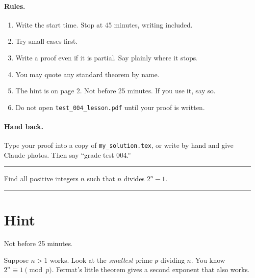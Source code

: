 \documentclass[11pt]{article}
\begin{document}

\paragraph{Rules.}
\begin{enumerate}
  \item Write the start time. Stop at 45 minutes, writing included.
  \item Try small cases first.
  \item Write a proof even if it is partial. Say plainly where it stops.
  \item You may quote any standard theorem by name.
  \item The hint is on page 2. Not before 25 minutes. If you use it, say so.
  \item Do not open \texttt{test\_004\_lesson.pdf} until your proof is written.
\end{enumerate}

\paragraph{Hand back.} Type your proof into a copy of \texttt{my\_solution.tex}, or write by hand and give Claude photos. Then say ``grade test 004.''

\vspace{10pt}\hrule\vspace{10pt}

\begin{problem}
Find all positive integers $n$ such that $n$ divides $2^n - 1$.
\end{problem}

\vspace{10pt}\hrule

\clearpage
\section*{Hint}
Not before 25 minutes.

\spoilerspace
\begin{hint}
Suppose $n > 1$ works. Look at the \emph{smallest} prime $p$ dividing $n$. You know $2^n \equiv 1 \pmod p$. Fermat's little theorem gives a second exponent that also works.
\end{hint}
\end{document}
